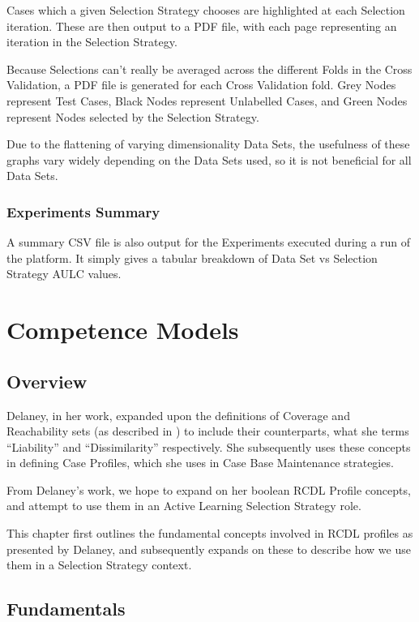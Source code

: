 \documentclass[a4paper,11pt]{report}
\begin{document}
Cases which a given Selection Strategy chooses are highlighted at each Selection iteration. These are then output to a PDF file, with each page representing an iteration in the Selection Strategy.

Because Selections can't really be averaged across the different Folds in the Cross Validation, a PDF file is generated for each Cross Validation fold. Grey Nodes represent Test Cases, Black Nodes represent Unlabelled Cases, and Green Nodes represent Nodes selected by the Selection Strategy.

Due to the flattening of varying dimensionality Data Sets, the usefulness of these graphs vary widely depending on the Data Sets used, so it is not beneficial for all Data Sets.

\subsection{Experiments Summary}
A summary CSV file is also output for the Experiments executed during a run of the platform. It simply gives a tabular breakdown of Data Set vs Selection Strategy AULC values.

\chapter{Competence Models\label{cha:CompetenceModels}}
\section{Overview}

Delaney, in her work, expanded upon the definitions of Coverage and Reachability sets (as described in \citet{Smyth1995}) to include their counterparts, what she terms ``Liability'' and ``Dissimilarity'' respectively\citep{Delany2009}. She subsequently uses these concepts in defining Case Profiles, which she uses in Case Base Maintenance strategies.

From Delaney's work, we hope to expand on her boolean RCDL Profile concepts, and attempt to use them in an Active Learning Selection Strategy role.

This chapter first outlines the fundamental concepts involved in RCDL profiles as presented by Delaney, and subsequently expands on these to describe how we use them in a Selection Strategy context.

\section{Fundamentals}
\end{document}

